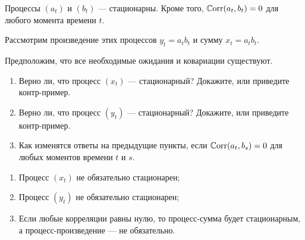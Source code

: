 \begin{problem}
  Процессы $(a_t)$ и $(b_t)$ — стационарны. 
  Кроме того, $\operatorname{\mathbb{C}\mathrm{orr}}(a_t, b_t) = 0$ для любого момента времени $t$. 
  
  Рассмотрим произведение этих процессов $y_t = a_t b_t$ и сумму $x_t = a_t b_t$.

  Предположим, что все необходимые ожидания и ковариации существуют. 

  \begin{enumerate}
    \item Верно ли, что процесс $(x_t)$ — стационарный? Докажите, или приведите контр-пример.
    \item Верно ли, что процесс $(y_t)$ — стационарный? Докажите, или приведите контр-пример.
    \item Как изменятся ответы на предыдущие пункты, если $\operatorname{\mathbb{C}\mathrm{orr}}(a_t, b_s) = 0$ для любых моментов времени $t$ и $s$.
  \end{enumerate}
\begin{sol}
\begin{enumerate}
  \item Процесс $(x_t)$ не обязательно стационарен;
\item Процесс $(y_t)$ не обязательно стационарен;
\item Если любые корреляции равны нулю, то процесс-сумма будет стационарным, а процесс-произведение — не обязательно. 
\end{enumerate}
\end{sol}
\end{problem}
